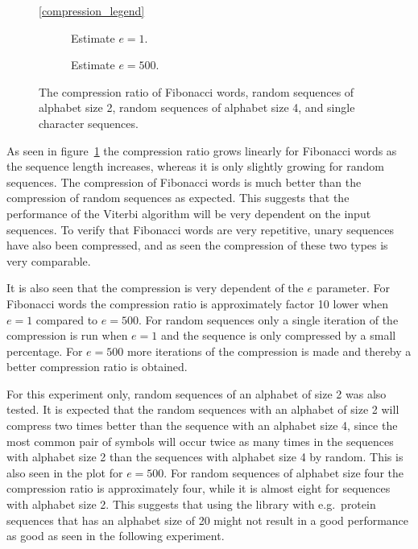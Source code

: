 \begin{figure}
  \centering\ref{compression_legend}
  \begin{subfigure}[b]{0.5\textwidth}
    \centering 
    \caption{Estimate $e = 1$.}
  \end{subfigure}%
  \begin{subfigure}[b]{0.5\textwidth}
    \centering 
    \caption{Estimate $e = 500$.}
  \end{subfigure}
  \caption{The compression ratio of Fibonacci words, random sequences of
    alphabet size 2, random sequences of alphabet size 4, and single character
    sequences.}
  \label{fig:compression_ratio}
\end{figure}

As seen in figure~\ref{fig:compression_ratio} the compression ratio grows
linearly for Fibonacci words as the sequence length increases, whereas it
is only slightly growing for random sequences. The compression of Fibonacci
words is much better than the compression of random sequences as
expected. This suggests that the performance of the Viterbi algorithm will be
very dependent on the input sequences. To verify that Fibonacci words
are very repetitive, unary sequences have also been compressed, and as seen the
compression of these two types is very comparable.

It is also seen that the compression is very dependent of the $e$ parameter.
For Fibonacci words the compression ratio is approximately factor 10 lower when
$e = 1$ compared to $e = 500$. For random sequences only a single iteration of
the compression is run when $e = 1$ and the sequence is only compressed by a
small percentage. For $e = 500$ more iterations of the compression is made and
thereby a better compression ratio is obtained.

For this experiment only, random sequences of an alphabet of size 2 was also
tested. It is expected that the random sequences with an alphabet of size 2
will compress two times better than the sequence with an alphabet size 4, since
the most common pair of symbols will occur twice as many times in the sequences
with alphabet size 2 than the sequences with alphabet size 4 by random.
 This is also seen
in the plot for $e = 500$. For random sequences of alphabet size four the compression ratio
is approximately four, while it is almost eight for sequences with alphabet
size 2. This suggests that using the library with e.g.\ protein sequences that
has an alphabet size of 20 might not result in a good performance as good as seen
in the following experiment.


